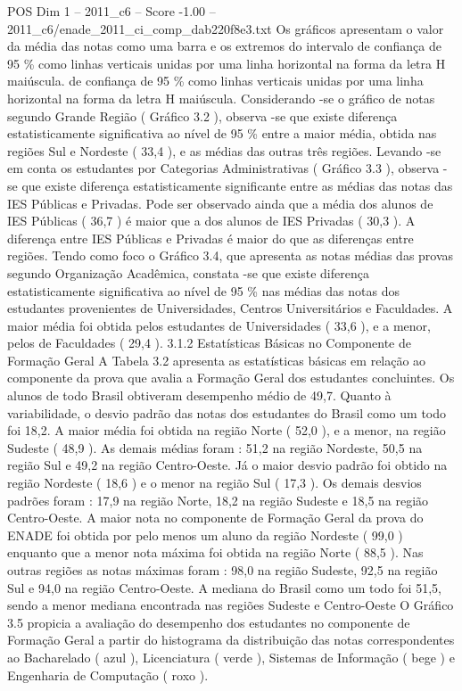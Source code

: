 \begin{textsample}{POS Dim 1 – 2011\_c6 – Score -1.00 – 2011\_c6/enade\_2011\_ci\_comp\_dab220f8e3.txt}
Os gráficos apresentam o valor da média das notas como uma barra e os extremos do intervalo de confiança de 95 \% como linhas verticais unidas por uma linha horizontal na forma da letra H maiúscula. de confiança de 95 \% como linhas verticais unidas por uma linha horizontal na forma da letra H maiúscula.
Considerando -se o gráfico de notas segundo Grande Região ( Gráfico 3.2 ), observa -se que existe diferença estatisticamente significativa ao nível de 95 \% entre a maior média, obtida nas regiões Sul e Nordeste ( 33,4 ), e as médias das outras três regiões.
Levando -se em conta os estudantes por Categorias Administrativas ( Gráfico 3.3 ), observa -se que existe diferença estatisticamente significante entre as médias das notas das IES Públicas e Privadas.
Pode ser observado ainda que a média dos alunos de IES Públicas ( 36,7 ) é maior que a dos alunos de IES Privadas ( 30,3 ).
A diferença entre IES Públicas e Privadas é maior do que as diferenças entre regiões.
Tendo como foco o Gráfico 3.4, que apresenta as notas médias das provas segundo Organização Acadêmica, constata -se que existe diferença estatisticamente significativa ao nível de 95 \% nas médias das notas dos estudantes provenientes de Universidades, Centros Universitários e Faculdades.
A maior média foi obtida pelos estudantes de Universidades ( 33,6 ), e a menor, pelos de Faculdades ( 29,4 ). 3.1.2 Estatísticas Básicas no Componente de Formação Geral A Tabela 3.2 apresenta as estatísticas básicas em relação ao componente da prova que avalia a Formação Geral dos estudantes concluintes.
Os alunos de todo Brasil obtiveram desempenho médio de 49,7.
Quanto à variabilidade, o desvio padrão das notas dos estudantes do Brasil como um todo foi 18,2.
A maior média foi obtida na região Norte ( 52,0 ), e a menor, na região Sudeste ( 48,9 ).
As demais médias foram : 51,2 na região Nordeste, 50,5 na região Sul e 49,2 na região Centro-Oeste.
Já o maior desvio padrão foi obtido na região Nordeste ( 18,6 ) e o menor na região Sul ( 17,3 ).
Os demais desvios padrões foram : 17,9 na região Norte, 18,2 na região Sudeste e 18,5 na região Centro-Oeste.
A maior nota no componente de Formação Geral da prova do ENADE foi obtida por pelo menos um aluno da região Nordeste ( 99,0 ) enquanto que a menor nota máxima foi obtida na região Norte ( 88,5 ).
Nas outras regiões as notas máximas foram : 98,0 na região Sudeste, 92,5 na região Sul e 94,0 na região Centro-Oeste.
A mediana do Brasil como um todo foi 51,5, sendo a menor mediana encontrada nas regiões Sudeste e Centro-Oeste O Gráfico 3.5 propicia a avaliação do desempenho dos estudantes no componente de Formação Geral a partir do histograma da distribuição das notas correspondentes ao Bacharelado ( azul ), Licenciatura ( verde ), Sistemas de Informação ( bege ) e Engenharia de Computação ( roxo ).

\end{textsample}
